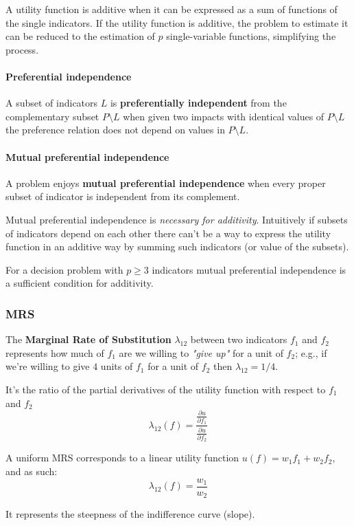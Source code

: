 A utility function is additive when it can be expressed as a sum of functions of the single indicators. If the utility function is additive, the problem to estimate it can be reduced to the estimation of $p$ single-variable functions, simplifying the process.

\paragraph{Preferential independence} A subset of indicators $L$ is \textbf{preferentially independent} from the complementary subset $P \setminus L$ when given two impacts with identical values of $P \setminus L$ the preference relation does not depend on values in $P \setminus L$.

\paragraph{Mutual preferential independence} A problem enjoys \textbf{mutual preferential independence} when every proper subset of indicator is independent from its complement. 

Mutual preferential independence is \textit{necessary for additivity}. Intuitively if subsets of indicators depend on each other there can't be a way to express the utility function in an additive way by summing such indicators (or value of the subsets).

For a decision problem with $p \geq 3$ indicators mutual preferential independence is a sufficient condition for additivity.

\subsubsection{MRS}

The \textbf{Marginal Rate of Substitution} $\lambda_{12}$ between two indicators $f_1$ and $f_2$ represents how much of $f_1$ are we willing to \textit{"give up"} for a unit of $f_2$; e.g., if we're willing to give $4$ units of $f_1$ for a unit of $f_2$ then $\lambda_{12} = 1/4$.

It's the ratio of the partial derivatives of the utility function with respect to $f_1$ and $f_2$
$$ \lambda_{12} (f) = \frac{ \frac{\partial u }{\partial f_1} }{ \frac{\partial u}{\partial f_2} } $$

A uniform MRS corresponds to a linear utility function $u(f) = w_1 f_1 + w_2 f_2$, and as such:
$$ \lambda_{12} (f) = \frac{w_1}{w_2} $$

It represents the steepness of the indifference curve (slope).

